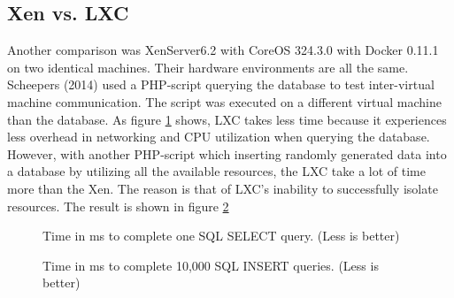 \documentclass{sig-alternate}
\begin{document}
\subsection{Xen vs. LXC}

Another comparison was XenServer6.2 with CoreOS 324.3.0 with Docker 0.11.1 on two identical machines. Their hardware environments are all the same. Scheepers (2014) \cite{vdcp:sche} used a PHP-script querying the database to test inter-virtual machine communication. The script was executed on a different virtual machine than the database. As figure \ref{fig:xen_core} shows, LXC takes less time because it experiences less overhead in networking and CPU utilization when querying the database. However, with another PHP-script which inserting randomly generated data into a database by utilizing all the available resources, the LXC take a lot of time more than the Xen. The reason is that of LXC's inability to successfully isolate resources. The result is shown in figure \ref{fig:xen_core2} 

\begin{figure}[htb]
\centering
{}
\caption{Time in ms to complete one SQL SELECT query. (Less is better)\cite{vdcp:sche}}
\label{fig:xen_core}
\vskip -6pt
\end{figure}

\begin{figure}[htb]
\centering
{}
\caption{Time in ms to complete 10,000 SQL INSERT queries. (Less is better)\cite{vdcp:sche}}
\label{fig:xen_core2}
\vskip -6pt
\end{figure}
\end{document}
